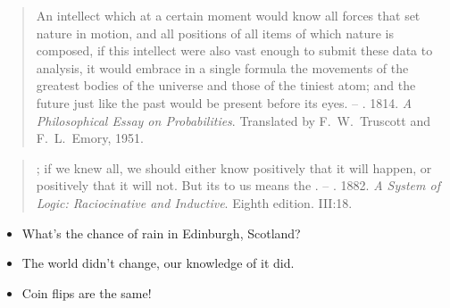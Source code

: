 \documentclass[9pt]{report}
\begin{document}
{\linespread{1.3}
\small\linespread{1.35}
\begin{quote}\linespread{1.5}An intellect which at a certain
  moment would know all forces that set nature in motion, and all
  positions of all items of which nature is composed, if this
  intellect were also vast enough to submit these data to analysis, it
  would embrace in a single formula the movements of the greatest
  bodies of the universe and those of the tiniest atom;  and the future just like the
  past would be present before its eyes.
  \vfill\linespread{1.25}
  -- \footnotesize {}. 1814.  \textit{A
    Philosophical Essay on Probabilities}.  Translated by
  F.~W.~Truscott and F.~L.~Emory, 1951.  
\end{quote}
}


{\linespread{1.3}
\small
\begin{quote}
; if we knew all, we should either know
positively that it will happen, or positively that it will not. But
its  to us means the .
\vfill\linespread{1.25}
-- \footnotesize {}.  1882.  \textit{A System
  of Logic: Raciocinative and Inductive}. Eighth edition.  III:18.
\end{quote}
}

\begin{itemize}
\item What's the chance of rain in Edinburgh, Scotland?
\item The world didn't change, our knowledge of it did.
  \vfill
\item Coin flips are the same!
\end{itemize}
\end{document}
